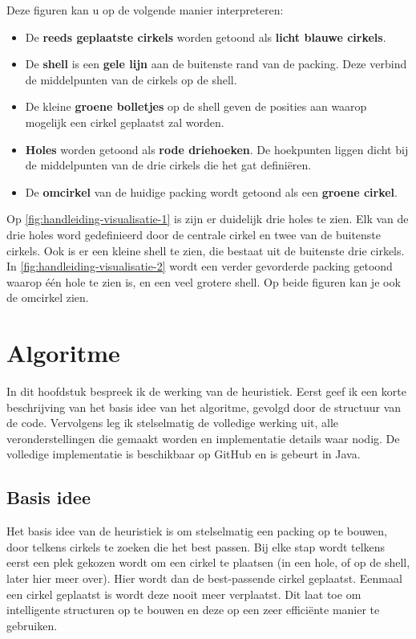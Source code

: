\documentclass[12pt,a4paper,oneside]{book}
\begin{document}
Deze figuren kan u op de volgende manier interpreteren:

\begin{itemize}  
\item De \textbf{reeds geplaatste cirkels} worden getoond als \textbf{licht blauwe cirkels}.
\item De \textbf{shell} is een \textbf{gele lijn} aan de buitenste rand van de packing. Deze verbind de middelpunten van de cirkels op de shell.
\item De kleine \textbf{groene bolletjes} op de shell geven de posities aan waarop mogelijk een cirkel geplaatst zal worden.
\item \textbf{Holes} worden getoond als \textbf{rode driehoeken}. De hoekpunten liggen dicht bij de middelpunten van de drie cirkels die het gat definiëren.
\item De \textbf{omcirkel} van de huidige packing wordt getoond als een \textbf{groene cirkel}.
\end{itemize}

Op \autoref{fig:handleiding-visualisatie-1} is zijn er duidelijk drie holes te zien.
Elk van de drie holes word gedefinieerd door de centrale cirkel en twee van de buitenste cirkels.
Ook is er een kleine shell te zien, die bestaat uit de buitenste drie cirkels.
In \autoref{fig:handleiding-visualisatie-2} wordt een verder gevorderde packing getoond waarop één hole te zien is, en een veel grotere shell.
Op beide figuren kan je ook de omcirkel zien.

\chapter{Algoritme} \label{chap:algoritme}

In dit hoofdstuk bespreek ik de werking van de heuristiek.
Eerst geef ik een korte beschrijving van het basis idee van het algoritme, gevolgd door de structuur van de code.
Vervolgens leg ik stelselmatig de volledige werking uit, alle veronderstellingen die gemaakt worden en implementatie details waar nodig.
De volledige implementatie is beschikbaar op GitHub \cite{circle-packing-github} en is gebeurt in Java.

\section{Basis idee}

Het basis idee van de heuristiek is om stelselmatig een packing op te bouwen, door telkens cirkels te zoeken die het best passen.
Bij elke stap wordt telkens eerst een plek gekozen wordt om een cirkel te plaatsen (in een hole, of op de shell, later hier meer over).
Hier wordt dan de best-passende cirkel geplaatst.
Eenmaal een cirkel geplaatst is wordt deze nooit meer verplaatst.
Dit laat toe om intelligente structuren op te bouwen en deze op een zeer efficiënte manier te gebruiken.
\end{document}
